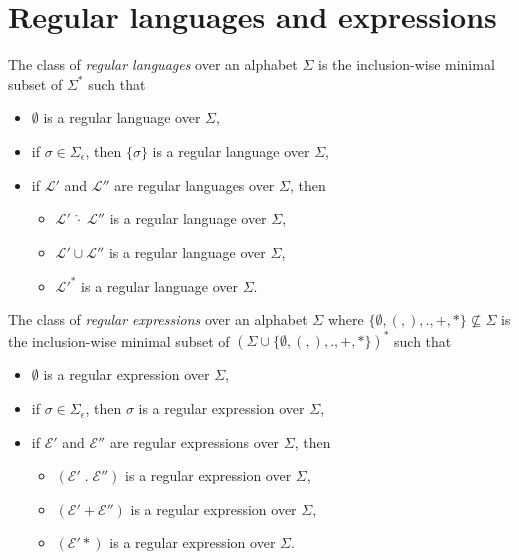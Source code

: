 \section{Regular languages and expressions}

\begin{definition}
  The class of \emph{regular languages} over an alphabet $\Sigma$ is the
  inclusion-wise minimal subset of $\Sigma^*$ such that
  \begin{itemize}
    \item $\emptyset$ is a regular language over $\Sigma$,
    \item if $\sigma \in \Sigma_\epsilon$, then $\{ \sigma \}$ is a regular language
	    over $\Sigma$,
    \item if $\mathcal{L}'$ and $\mathcal{L}''$ are regular languages over $\Sigma$,
	    then
	    \begin{itemize}
              \item $\mathcal{L}'\;\hat{\cdot}\;\mathcal{L}''$ is a regular language
		      over $\Sigma$,
              \item $\mathcal{L}' \cup \mathcal{L}''$ is a regular language over
		      $\Sigma$,
              \item $\mathcal{L}'^*$ is a regular language over $\Sigma$.
            \end{itemize}
  \end{itemize}
\end{definition}

\begin{definition}
  The class of \emph{regular expressions} over an alphabet $\Sigma$ where $\{
  \emptyset, (, ), ., +, * \} \not\subseteq \Sigma$ is the inclusion-wise minimal
  subset of $(\Sigma \cup \{ \emptyset, (, ), ., +, * \})^*$ such that
  \begin{itemize}
    \item $\emptyset$ is a regular expression over $\Sigma$,
    \item if $\sigma \in \Sigma_\epsilon$, then $\sigma$ is a regular expression over
	    $\Sigma$,
    \item if $\mathcal{E}'$ and $\mathcal{E}''$ are regular expressions over
          $\Sigma$, then
          \begin{itemize}
            \item $(\mathcal{E}'\;.\;\mathcal{E}'')$ is a regular expression over
                  $\Sigma$,
            \item $(\mathcal{E}'+\mathcal{E}'')$ is a regular expression over
                  $\Sigma$,
            \item $(\mathcal{E}'*)$ is a regular expression over $\Sigma$.
          \end{itemize}
  \end{itemize}
\end{definition}

